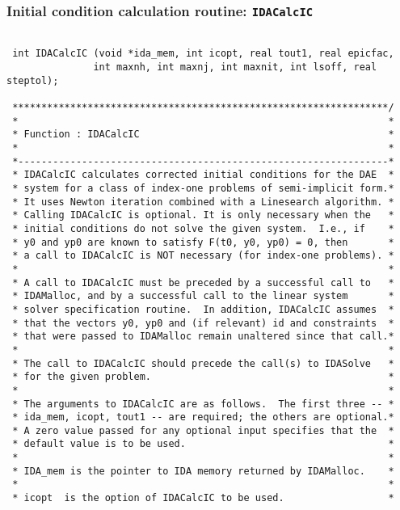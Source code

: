 \subsubsection{Initial condition calculation routine: {\tt IDACalcIC}}

\small
\begin{verbatim}

 int IDACalcIC (void *ida_mem, int icopt, real tout1, real epicfac, 
               int maxnh, int maxnj, int maxnit, int lsoff, real steptol);

 *****************************************************************/
 *                                                                *
 * Function : IDACalcIC                                           *
 *                                                                *
 *----------------------------------------------------------------*
 * IDACalcIC calculates corrected initial conditions for the DAE  *
 * system for a class of index-one problems of semi-implicit form.*
 * It uses Newton iteration combined with a Linesearch algorithm. *
 * Calling IDACalcIC is optional. It is only necessary when the   *
 * initial conditions do not solve the given system.  I.e., if    *
 * y0 and yp0 are known to satisfy F(t0, y0, yp0) = 0, then       *
 * a call to IDACalcIC is NOT necessary (for index-one problems). *
 *                                                                *
 * A call to IDACalcIC must be preceded by a successful call to   *
 * IDAMalloc, and by a successful call to the linear system       *
 * solver specification routine.  In addition, IDACalcIC assumes  *
 * that the vectors y0, yp0 and (if relevant) id and constraints  *
 * that were passed to IDAMalloc remain unaltered since that call.*
 *                                                                *
 * The call to IDACalcIC should precede the call(s) to IDASolve   *
 * for the given problem.                                         *  
 *                                                                *
 * The arguments to IDACalcIC are as follows.  The first three -- *
 * ida_mem, icopt, tout1 -- are required; the others are optional.*
 * A zero value passed for any optional input specifies that the  *
 * default value is to be used.                                   *
 *                                                                *
 * IDA_mem is the pointer to IDA memory returned by IDAMalloc.    *
 *                                                                *
 * icopt  is the option of IDACalcIC to be used.                  *

\end{verbatim}

